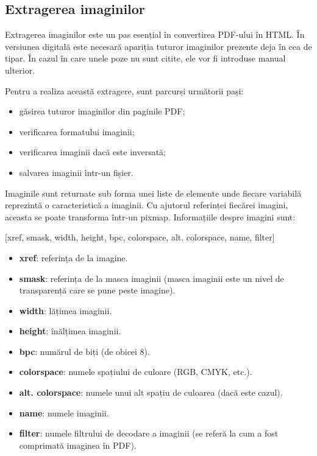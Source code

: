 \subsection{Extragerea imaginilor}

Extragerea imaginilor este un pas esențial în convertirea PDF-ului în HTML. În versiunea digitală este necesară apariția tuturor imaginilor prezente deja în cea de tipar. În cazul în care unele poze nu sunt citite, ele vor fi introduse manual ulterior.

Pentru a realiza această extragere, sunt parcurși următorii pași:
\begin{itemize}
	\item găsirea tuturor imaginilor din paginile PDF;
	\item verificarea formatului imaginii;
	\item verificarea imaginii dacă este inversată;
	\item salvarea imaginii într-un fișier.
\end{itemize}

Imaginile sunt returnate sub forma unei liste de elemente unde fiecare variabilă reprezintă o caracteristică a imaginii. Cu ajutorul referinței fiecărei imagini, aceasta se poate transforma într-un pixmap. Informațiile despre imagini sunt:
\begin{center}
	[xref, smask, width, height, bpc, colorspace, alt. colorspace, name, filter]
\end{center}

\begin{itemize}
	\item \textbf{xref}: referința de la imagine.
	\item \textbf{smask}: referința de la masca imaginii (masca imaginii este un nivel de transparență care se pune peste imagine).
	\item \textbf{width}: lățimea imaginii.
	\item \textbf{height}: înălțimea imaginii.
	\item \textbf{bpc}: numărul de biți (de obicei 8).
	\item \textbf{colorspace}: numele spațiului de culoare (RGB, CMYK, etc.).
	\item \textbf{alt. colorspace}: numele unui alt spațiu de culoarea (dacă este cazul).
	\item \textbf{name}: numele imaginii.
	\item \textbf{filter}: numele filtrului de decodare a imaginii (se referă la cum a fost comprimată imaginea în PDF).
\end{itemize}

